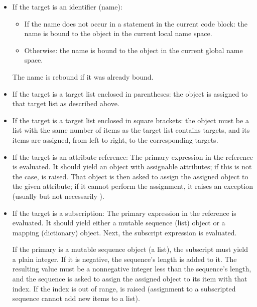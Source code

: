 \begin{itemize} %

\item
If the target is an identifier (name):

\begin{itemize}

\item
If the name does not occur in a \verb@global@ statement in the current
code block: the name is bound to the object in the current local name
space.

\item
Otherwise: the name is bound to the object in the current global name
space.

\end{itemize} %

The name is rebound if it was already bound.

\item
If the target is a target list enclosed in parentheses: the object is
assigned to that target list as described above.

\item
If the target is a target list enclosed in square brackets: the object
must be a list with the same number of items as the target list
contains targets, and its items are assigned, from left to right, to
the corresponding targets.

\item
If the target is an attribute reference: The primary expression in the
reference is evaluated.  It should yield an object with assignable
attributes; if this is not the case, \verb@TypeError@ is raised.  That
object is then asked to assign the assigned object to the given
attribute; if it cannot perform the assignment, it raises an exception
(usually but not necessarily \verb@AttributeError@).

\item
If the target is a subscription: The primary expression in the
reference is evaluated.  It should yield either a mutable sequence
(list) object or a mapping (dictionary) object.  Next, the subscript
expression is evaluated.

If the primary is a mutable sequence object (a list), the subscript
must yield a plain integer.  If it is negative, the sequence's length
is added to it.  The resulting value must be a nonnegative integer
less than the sequence's length, and the sequence is asked to assign
the assigned object to its item with that index.  If the index is out
of range, \verb@IndexError@ is raised (assignment to a subscripted
sequence cannot add new items to a list).


\end{itemize}

